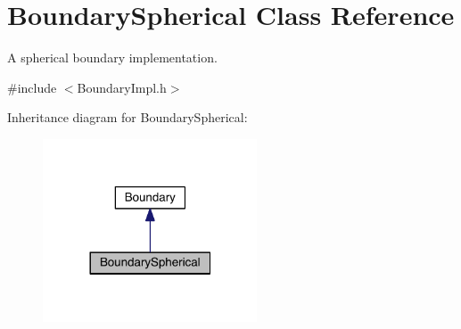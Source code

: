 \hypertarget{classBoundarySpherical}{\section{Boundary\+Spherical Class Reference}
\label{classBoundarySpherical}
}


A spherical boundary implementation.  




{\ttfamily \#include $<$Boundary\+Impl.\+h$>$}



Inheritance diagram for Boundary\+Spherical\+:
\nopagebreak
\begin{figure}[H]
\begin{center}
\leavevmode
\includegraphics[width=180pt]{classBoundarySpherical__inherit__graph}
\end{center}
\end{figure}


